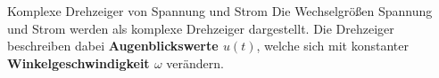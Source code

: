 \begin{frame}

    \begin{Merksatz}{Komplexe Drehzeiger von Spannung und Strom}
        Die Wechselgrößen Spannung und Strom werden als komplexe Drehzeiger dargestellt. Die Drehzeiger beschreiben dabei
            {\bf Augenblickswerte $u(t)$}, welche sich mit konstanter {\bf Winkelgeschwindigkeit $\omega$} verändern.
    \end{Merksatz}

\end{frame}



